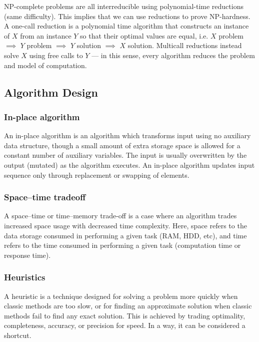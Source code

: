 \documentclass{article}
\begin{document}
    NP-complete problems are all interreducible using polynomial-time reductions (same difficulty). This implies that we can use reductions to prove NP-hardness. A one-call reduction is a polynomial time algorithm that constructs an instance of $X$ from an instance $Y$ so that their optimal values are equal, i.e. $X$ problem $\implies$ $Y$ problem $\implies$ $Y$ solution $\implies$ $X$ solution. Multicall reductions instead solve $X$ using free calls to $Y$ — in this sense, every algorithm reduces the problem and model of computation.
    
    \newpage
    
    \subsection{Algorithm Design}
    \subsubsection{In-place algorithm}
        An in-place algorithm is an algorithm which transforms input using no auxiliary data structure, though a small amount of extra storage space is allowed for a constant number of auxiliary variables. The input is usually overwritten by the output (mutated) as the algorithm executes. An in-place algorithm updates input sequence only through replacement or swapping of elements.
        
    \subsubsection{Space–time tradeoff}
        A space–time or time–memory trade-off is a case where an algorithm trades increased space usage with decreased time complexity. Here, space refers to the data storage consumed in performing a given task (RAM, HDD, etc), and time refers to the time consumed in performing a given task (computation time or response time).
        
    \subsubsection{Heuristics}
        A heuristic is a technique designed for solving a problem more quickly when classic methods are too slow, or for finding an approximate solution when classic methods fail to find any exact solution. This is achieved by trading optimality, completeness, accuracy, or precision for speed. In a way, it can be considered a shortcut.
    
\end{document}
